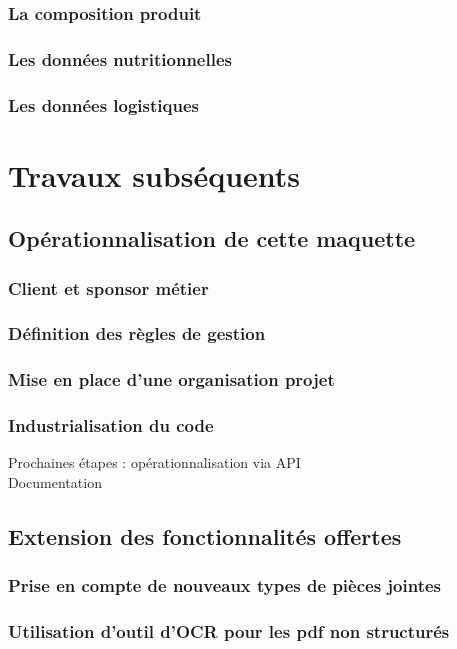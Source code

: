 \documentclass{report}
\begin{document}
        \section{La composition produit}
        \section{Les données nutritionnelles}
        \section{Les données logistiques}

\part{Travaux subséquents}
    \chapter{Opérationnalisation de cette maquette}    
        \section{Client et sponsor métier}
        \section{Définition des règles de gestion}
        \section{Mise en place d'une organisation projet}
        \section{Industrialisation du code}
        Prochaines étapes : opérationnalisation via API \\
        Documentation
    \chapter{Extension des fonctionnalités offertes}
        \section{Prise en compte de nouveaux types de pièces jointes}
        \section{Utilisation d'outil d'OCR pour les pdf non structurés}
\end{document}
